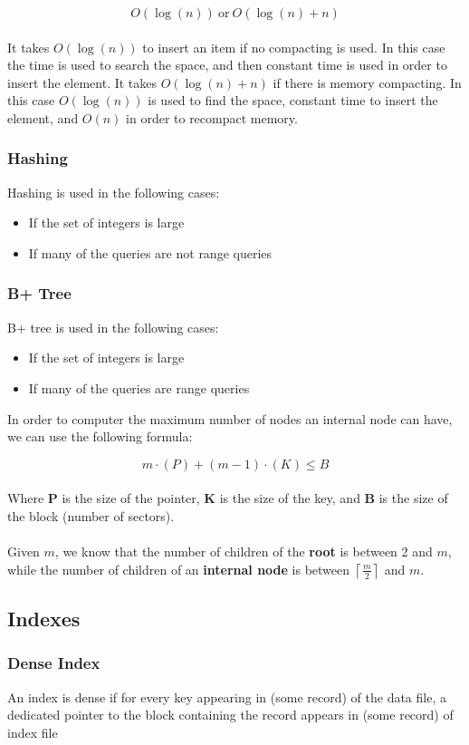 \documentclass{article}
\begin{document}
\[ O(\log(n))~\text{or}~O(\log(n) + n) \] \\
It takes $O(\log(n))$ to insert an item if no compacting is used. In this case the time is used to search the space, and then constant time is used in order to insert the element. It takes $O(\log(n) + n)$ if there is memory compacting. In this case $O(\log(n))$ is used to find the space, constant time to insert the element, and $O(n)$ in order to recompact memory.

\subsubsection{Hashing}
Hashing is used in the following cases:

\begin{itemize}
	\item If the set of integers is large
	\item If many of the queries are not range queries
\end{itemize}

\subsubsection{B+ Tree}
B+ tree is used in the following cases:

\begin{itemize}
	\item If the set of integers is large
	\item If many of the queries are range queries
\end{itemize}
In order to computer the maximum number of nodes an internal node can have, we can use the following formula:

\[ m \cdot (P) + (m-1) \cdot (K) \leq B \] \\
Where \textbf{P} is the size of the pointer, \textbf{K} is the size of the key, and \textbf{B} is the size of the block (number of sectors). \\ \\
Given $m$, we know that the number of children of the \textbf{root} is between 2 and $m$, while the number of children of an \textbf{internal node} is between $\left\lceil\frac{m}{2}\right\rceil$ and $m$.

\subsection{Indexes}
\subsubsection{Dense Index}
An index is dense if for every key appearing in (some record) of the data file, a dedicated pointer to the block containing the record appears in (some record) of index file
\end{document}
